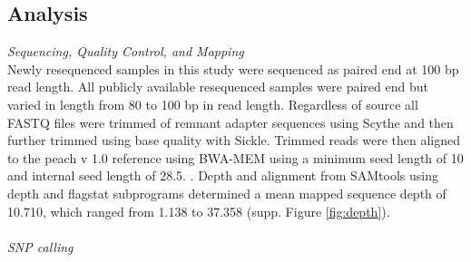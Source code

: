 \documentclass[12pt]{article}
\begin{document}
\subsection*{Analysis}
\emph{Sequencing, Quality Control, and Mapping}\\
Newly resequenced samples in this study were sequenced as paired end at 100 bp read length. 
%
All publicly available resequenced samples were paired end but varied in length from 80 to 100 bp in read length. 
%
Regardless of source all FASTQ files were trimmed of remnant adapter sequences using Scythe and then further trimmed using base quality with Sickle. 
%
%
%
Trimmed reads were then aligned to the peach v 1.0 reference using BWA-MEM using a minimum seed length of 10 and internal seed length of 28.5.
%
 \citep{li2013aligning}. 
%
Depth and alignment from SAMtools using depth and flagstat subprograms \citep{li2009sequence} 
determined a mean mapped sequence depth of 10.710, which ranged from 1.138 to 37.358 (supp. Figure \ref{fig:depth}).\\
%
%
\\
\emph{SNP calling}\\ %
%
\end{document}
